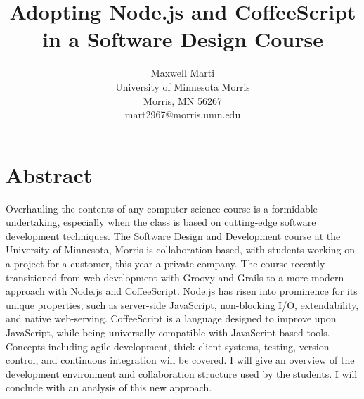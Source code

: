 \documentclass[12pt]{article}
\newcommand{\comment}[1]{{\bf \tt  {#1}}}
\begin{document}
\pagestyle{plain}
%




\title{Adopting Node.js and CoffeeScript in a Software Design Course}
%
%




\author{
Maxwell Marti \\
University of Minnesota Morris\\
Morris, MN 56267\\
mart2967@morris.umn.edu
}




\date{}




\maketitle
\thispagestyle{empty}


\section*{\centering Abstract}
Overhauling the contents of any computer science course is a formidable undertaking, especially when the class is based on cutting-edge software development techniques. The Software Design and Development course at the University of Minnesota, Morris is collaboration-based, with students working on a project for a customer, this year a private company. The course   recently transitioned from web development with Groovy and Grails to a more modern approach with Node.js and CoffeeScript. Node.js has risen into prominence for its unique properties, such as server-side JavaScript, non-blocking I/O, extendability, and native web-serving. CoffeeScript is a language designed to improve upon JavaScript, while being universally compatible with JavaScript-based tools. Concepts including agile development, thick-client systems, testing, version control, and continuous integration will be covered. I will give an overview of the development environment and collaboration structure used by the students. I will conclude with an analysis of this new approach.
\end{document}
